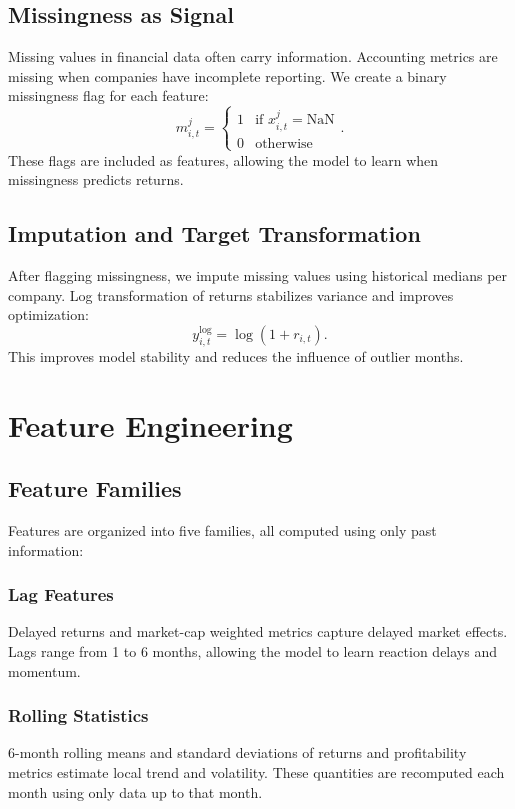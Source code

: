 \documentclass[11pt]{article}
\begin{document}
\subsection{Missingness as Signal}
Missing values in financial data often carry information. Accounting metrics are missing when companies have incomplete reporting. We create a binary missingness flag for each feature:
\begin{equation}
m_{i,t}^j = \begin{cases} 1 & \text{if } x_{i,t}^j = \mathrm{NaN} \\ 0 & \text{otherwise} \end{cases}.
\end{equation}
These flags are included as features, allowing the model to learn when missingness predicts returns.

\subsection{Imputation and Target Transformation}
After flagging missingness, we impute missing values using historical medians per company. Log transformation of returns stabilizes variance and improves optimization:
\begin{equation}
y_{i,t}^{\log} = \log(1 + r_{i,t}).
\end{equation}
This improves model stability and reduces the influence of outlier months.

\section{Feature Engineering}

\subsection{Feature Families}
Features are organized into five families, all computed using only past information:

\subsubsection{Lag Features}
Delayed returns and market-cap weighted metrics capture delayed market effects. Lags range from 1 to 6 months, allowing the model to learn reaction delays and momentum.

\subsubsection{Rolling Statistics}
6-month rolling means and standard deviations of returns and profitability metrics estimate local trend and volatility. These quantities are recomputed each month using only data up to that month.
\end{document}
